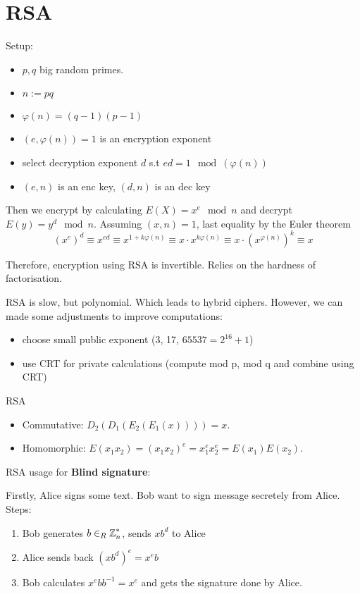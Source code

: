 \section{\texorpdfstring{RSA}{RSA}}
\vspace{5mm}
\large

Setup:
\begin{itemize}
	\item $p,q$ big random primes.
	\item $n:= pq$
	\item $\varphi(n) = (q - 1)(p - 1)$
	\item $(e, \varphi(n)) = 1$ is an encryption exponent
	\item select decryption exponent $d$ s.t $ed = 1 \mod(\varphi(n))$
	\item $(e, n)$ is an enc key, $(d, n)$ is an dec key
\end{itemize}

Then we encrypt by calculating $E(X) = x^e \mod n$ and decrypt $E(y) = y^d \mod n$.
Assuming $(x, n) = 1$, last equality by the Euler theorem
\[ (x^e)^d \equiv x^{ed} \equiv x^{1 + k\varphi(n)} \equiv x \cdot x^{k \varphi(n)} \equiv x \cdot (x^{\varphi(n)})^k \equiv x \]

Therefore, encryption using RSA is invertible.
Relies on the hardness of factorisation.

RSA is slow, but polynomial. Which leads to hybrid ciphers.
However, we can made some adjustments to improve computations:
\begin{itemize}
	\item choose small public exponent (3, 17, $65537 = 2^{16} + 1$)
	\item use CRT for private calculations (compute mod p, mod q and combine using CRT)
\end{itemize}

\begin{properties} RSA
\begin{itemize}
	\item Commutative: $D_2(D_1(E_2(E_1(x)))) = x$.
	\item Homomorphic: $E(x_1 x_2) = (x_1 x_2)^e = x_1^e x_2^e = E(x_1) E(x_2)$.
\end{itemize}
\end{properties}

\begin{example}
	RSA usage for \textbf{Blind signature}:

	Firstly, Alice signs some text. Bob want to sign message secretely from Alice. Steps:
	\begin{enumerate}
		\item Bob generates $b \in_R \operatorname{\mathbb{Z}}_n^{\ast}$, sends $x b^d$ to Alice
		\item Alice sends back $(x b^d)^e = x^e b$
		\item Bob calculates $x^e b b^{-1} = x^e$ and gets the signature done by Alice.
	\end{enumerate}
\end{example}


